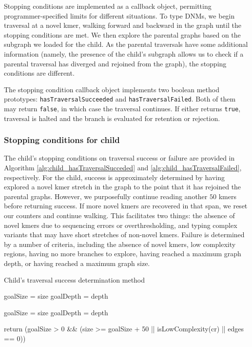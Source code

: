 Stopping conditions are implemented as a callback object, permitting programmer-specified limits for different situations.  To type DNMs, we begin traversal at a novel kmer, walking forward and backward in the graph until the stopping conditions are met.  We then explore the parental graphs based on the subgraph we loaded for the child.  As the parental traversals have some additional information (namely, the presence of the child's subgraph allows us to check if a parental traversal has diverged and rejoined from the graph), the stopping conditions are different.

The stopping condition callback object implements two boolean method prototypes: \texttt{hasTraversalSucceeded} and \texttt{hasTraversalFailed}.  Both of them may return \texttt{false}, in which case the traversal continues.  If either returns \texttt{true}, traversal is halted and the branch is evaluated for retention or rejection.

\subsubsection{Stopping conditions for child}

The child's stopping conditions on traversal success or failure are provided in Algorithm \ref{alg:child_hasTraversalSucceded} and \ref{alg:child_hasTraversalFailed}, respectively.  For the child, success is approximately determined by having explored a novel kmer stretch in the graph to the point that it has rejoined the parental graphs.  However, we purposefully continue reading another $50$ kmers before returning success.  If more novel kmers are recovered in that span, we reset our counters and continue walking.  This facilitates two things: the absence of novel kmers due to sequencing errors or overthresholding, and typing complex variants that may have short stretches of non-novel kmers.  Failure is determined by a number of criteria, including the absence of novel kmers, low complexity regions, having no more branches to explore, having reached a maximum graph depth, or having reached a maximum graph size.

\begin{algorithm}
\caption{Child's traversal success determination method}
\label{alg:child_hasTraversalSucceded}
\begin{algorithmic}[1]
        \State goalSize = size
        \State goalDepth = depth
    \EndIf

        \State goalSize = size
        \State goalDepth = depth
    \EndIf

    \State return (goalSize > 0 \&\& (size >= goalSize + 50 || isLowComplexity(cr) || edges == 0))
\EndFunction
\end{algorithmic}
\end{algorithm}


